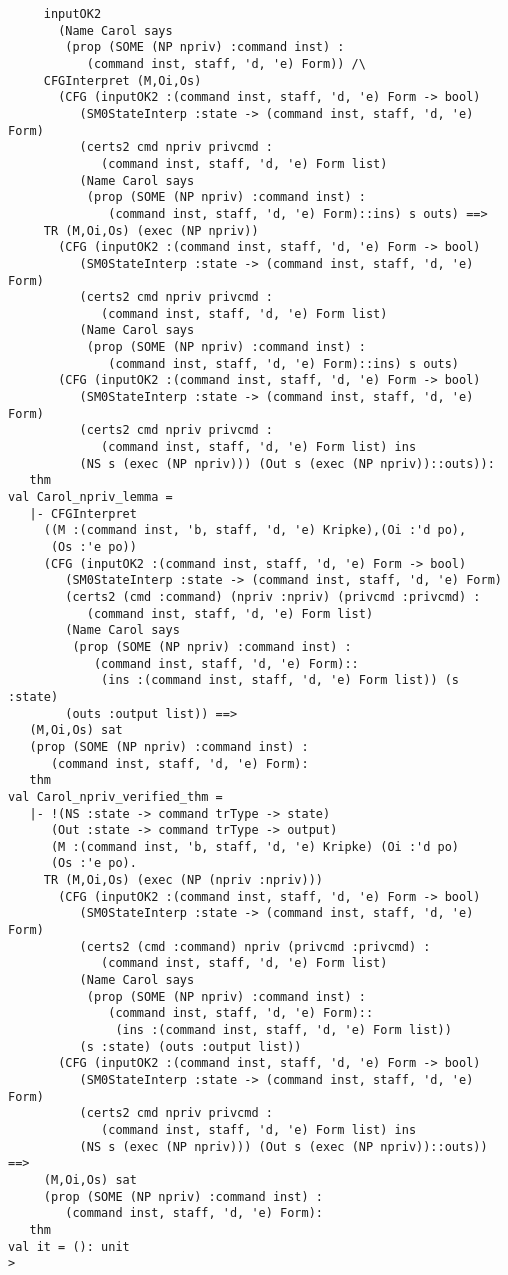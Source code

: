 \documentclass{report}
\begin{document}
\begin{session}
\begin{scriptsize}
\begin{verbatim}
     inputOK2
       (Name Carol says
        (prop (SOME (NP npriv) :command inst) :
           (command inst, staff, 'd, 'e) Form)) /\
     CFGInterpret (M,Oi,Os)
       (CFG (inputOK2 :(command inst, staff, 'd, 'e) Form -> bool)
          (SM0StateInterp :state -> (command inst, staff, 'd, 'e) Form)
          (certs2 cmd npriv privcmd :
             (command inst, staff, 'd, 'e) Form list)
          (Name Carol says
           (prop (SOME (NP npriv) :command inst) :
              (command inst, staff, 'd, 'e) Form)::ins) s outs) ==>
     TR (M,Oi,Os) (exec (NP npriv))
       (CFG (inputOK2 :(command inst, staff, 'd, 'e) Form -> bool)
          (SM0StateInterp :state -> (command inst, staff, 'd, 'e) Form)
          (certs2 cmd npriv privcmd :
             (command inst, staff, 'd, 'e) Form list)
          (Name Carol says
           (prop (SOME (NP npriv) :command inst) :
              (command inst, staff, 'd, 'e) Form)::ins) s outs)
       (CFG (inputOK2 :(command inst, staff, 'd, 'e) Form -> bool)
          (SM0StateInterp :state -> (command inst, staff, 'd, 'e) Form)
          (certs2 cmd npriv privcmd :
             (command inst, staff, 'd, 'e) Form list) ins
          (NS s (exec (NP npriv))) (Out s (exec (NP npriv))::outs)):
   thm
val Carol_npriv_lemma =
   |- CFGInterpret
     ((M :(command inst, 'b, staff, 'd, 'e) Kripke),(Oi :'d po),
      (Os :'e po))
     (CFG (inputOK2 :(command inst, staff, 'd, 'e) Form -> bool)
        (SM0StateInterp :state -> (command inst, staff, 'd, 'e) Form)
        (certs2 (cmd :command) (npriv :npriv) (privcmd :privcmd) :
           (command inst, staff, 'd, 'e) Form list)
        (Name Carol says
         (prop (SOME (NP npriv) :command inst) :
            (command inst, staff, 'd, 'e) Form)::
             (ins :(command inst, staff, 'd, 'e) Form list)) (s :state)
        (outs :output list)) ==>
   (M,Oi,Os) sat
   (prop (SOME (NP npriv) :command inst) :
      (command inst, staff, 'd, 'e) Form):
   thm
val Carol_npriv_verified_thm =
   |- !(NS :state -> command trType -> state)
      (Out :state -> command trType -> output)
      (M :(command inst, 'b, staff, 'd, 'e) Kripke) (Oi :'d po)
      (Os :'e po).
     TR (M,Oi,Os) (exec (NP (npriv :npriv)))
       (CFG (inputOK2 :(command inst, staff, 'd, 'e) Form -> bool)
          (SM0StateInterp :state -> (command inst, staff, 'd, 'e) Form)
          (certs2 (cmd :command) npriv (privcmd :privcmd) :
             (command inst, staff, 'd, 'e) Form list)
          (Name Carol says
           (prop (SOME (NP npriv) :command inst) :
              (command inst, staff, 'd, 'e) Form)::
               (ins :(command inst, staff, 'd, 'e) Form list))
          (s :state) (outs :output list))
       (CFG (inputOK2 :(command inst, staff, 'd, 'e) Form -> bool)
          (SM0StateInterp :state -> (command inst, staff, 'd, 'e) Form)
          (certs2 cmd npriv privcmd :
             (command inst, staff, 'd, 'e) Form list) ins
          (NS s (exec (NP npriv))) (Out s (exec (NP npriv))::outs)) ==>
     (M,Oi,Os) sat
     (prop (SOME (NP npriv) :command inst) :
        (command inst, staff, 'd, 'e) Form):
   thm
val it = (): unit
> 


\end{verbatim}
\end{scriptsize}
\end{session}
\end{document}
